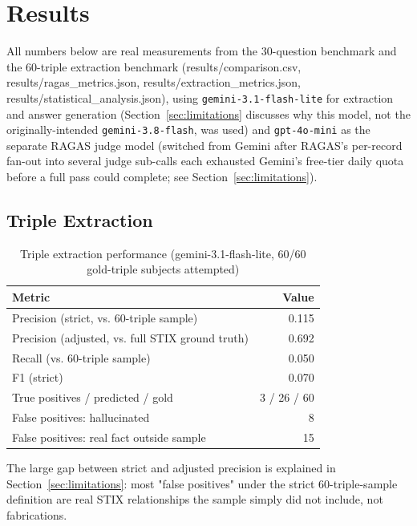 \documentclass[conference]{IEEEtran}
\begin{document}
\section{Results}
\label{sec:results}
All numbers below are real measurements from the 30-question benchmark and
the 60-triple extraction benchmark (results/comparison.csv,
results/ragas\_metrics.json, results/extraction\_metrics.json,
results/statistical\_analysis.json), using \texttt{gemini-3.1-flash-lite}
for extraction and answer generation (Section~\ref{sec:limitations}
discusses why this model, not the originally-intended
\texttt{gemini-3.8-flash}, was used) and \texttt{gpt-4o-mini} as the
separate RAGAS judge model (switched from Gemini after RAGAS's per-record
fan-out into several judge sub-calls each exhausted Gemini's free-tier
daily quota before a full pass could complete; see
Section~\ref{sec:limitations}).

\subsection{Triple Extraction}
\begin{table}[h]
\centering
\caption{Triple extraction performance (gemini-3.1-flash-lite, 60/60 gold-triple subjects attempted)}
\label{tab:extraction}
\begin{tabular}{@{}lr@{}}
\toprule
Metric & Value \\
\midrule
Precision (strict, vs. 60-triple sample) & 0.115 \\
Precision (adjusted, vs. full STIX ground truth) & 0.692 \\
Recall (vs. 60-triple sample) & 0.050 \\
F1 (strict) & 0.070 \\
True positives / predicted / gold & 3 / 26 / 60 \\
False positives: hallucinated & 8 \\
False positives: real fact outside sample & 15 \\
\bottomrule
\end{tabular}
\end{table}

The large gap between strict and adjusted precision is explained in
Section~\ref{sec:limitations}: most "false positives" under the strict
60-triple-sample definition are real STIX relationships the sample simply
did not include, not fabrications.
\end{document}
